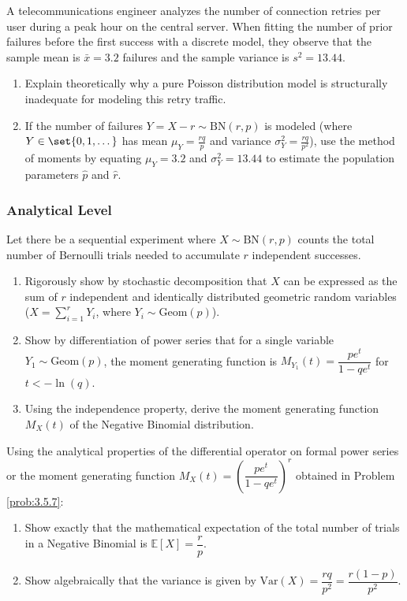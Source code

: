 \begin{problema}
	\label{prob:3.5.6}
	A telecommunications engineer analyzes the number of connection retries per user during a peak hour on the central server. When fitting the number of prior failures before the first success with a discrete model, they observe that the sample mean is $\bar{x} = 3.2$ failures and the sample variance is $s^2 = 13.44$.
	\begin{enumerate}
		\item Explain theoretically why a pure Poisson distribution model is structurally inadequate for modeling this retry traffic.
		\item If the number of failures $Y = X - r \sim \text{BN}(r, p)$ is modeled (where $Y \in \set{0, 1, \dots}$ has mean $\mu_Y = \frac{rq}{p}$ and variance $\sigma_Y^2 = \frac{rq}{p^2}$), use the method of moments by equating $\mu_Y = 3.2$ and $\sigma_Y^2 = 13.44$ to estimate the population parameters $\hat{p}$ and $\hat{r}$.
	\end{enumerate}
\end{problema}

\subsubsection*{Analytical Level}

\begin{problema}
	\label{prob:3.5.7}
	Let there be a sequential experiment where $X \sim \text{BN}(r, p)$ counts the total number of Bernoulli trials needed to accumulate $r$ independent successes.
	\begin{enumerate}
		\item Rigorously show by stochastic decomposition that $X$ can be expressed as the sum of $r$ independent and identically distributed geometric random variables ($X = \sum_{i=1}^r Y_i$, where $Y_i \sim \text{Geom}(p)$).
		\item Show by differentiation of power series that for a single variable $Y_1 \sim \text{Geom}(p)$, the moment generating function is $M_{Y_1}(t) = \dfrac{p e^t}{1 - q e^t}$ for $t < -\ln(q)$.
		\item Using the independence property, derive the moment generating function $M_X(t)$ of the Negative Binomial distribution.
	\end{enumerate}
\end{problema}

\begin{problema}
	\label{prob:3.5.8}
	Using the analytical properties of the differential operator on formal power series or the moment generating function $M_X(t) = \left(\dfrac{p e^t}{1 - q e^t}\right)^r$ obtained in Problem \ref{prob:3.5.7}:
	\begin{enumerate}
		\item Show exactly that the mathematical expectation of the total number of trials in a Negative Binomial is $\mathbb{E}[X] = \dfrac{r}{p}$.
		\item Show algebraically that the variance is given by $\text{Var}(X) = \dfrac{r q}{p^2} = \dfrac{r(1-p)}{p^2}$.
	\end{enumerate}
\end{problema}

